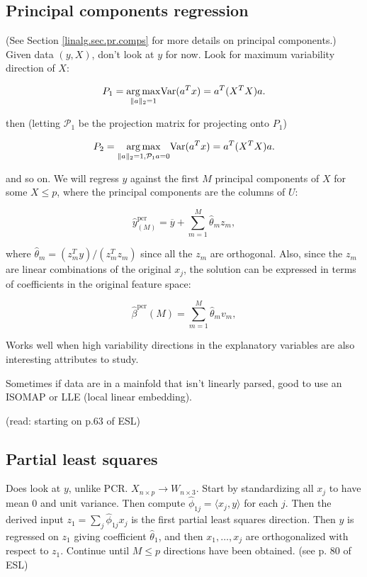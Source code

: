 \subsection{Principal components regression}

(See Section \ref{linalg.sec.pr.comps} for more details on principal components.) Given data \((y, X)\), don't look at \(y\) for now. Look for maximum variability direction of \(X\):

\[
P_1 = \underset{ \lVert a \rVert_2 = 1}{\arg \max}  \mathrm{Var}(a^Tx) = a^T(X^TX)a.
\]

then (letting \(\mathcal{P}_1\) be the projection matrix for projecting onto \(P_1\))

\[
P_2 = \underset{ \lVert a \rVert_2 = 1, \mathcal{P}_1a = 0}{\arg \max}  \mathrm{Var}(a^Tx) = a^T(X^TX)a.
\]

and so on. We will regress \(y\) against the first \(M\) principal components of \(X\) for some \(X \leq p\), where the principal components are the columns of \(U\):

\[
\hat{y}_{(M)}^{\text{pcr}} = \overline{y} + \sum_{m=1}^M\hat{\theta}_m z_m, 
\]

where \(\hat{\theta}_m = (z_m^Ty)/(z_m^Tz_m)\) since all the \(z_m\) are orthogonal. Also, since the \(z_m\) are linear combinations of the original \(x_j\), the solution can be expressed in terms of coefficients in the original feature space:

\[
\hat{\beta}^{\text{pcr}}(M)  =  \sum_{m=1}^M\hat{\theta}_m v_m, 
\]

Works well when high variability directions in the explanatory variables are also interesting attributes to study. 

Sometimes if data are in a mainfold that isn't linearly parsed, good to use an ISOMAP or LLE (local linear embedding).

(read: starting on p.63 of ESL)

\subsection{Partial least squares}

Does look at \(y\), unlike PCR. \(X_{n \times p} \to W_{n \times 3}\). Start by standardizing all \(x_j\) to have mean 0 and unit variance. Then compute \(\hat{\phi}_{1j} = \langle x_j, y \rangle\) for each \(j\). Then the derived input \(z_1 = \sum_j \hat{\phi}_{1j} x_j\) is the first partial least squares direction. Then \(y\) is regressed on \(z_1\) giving coefficient \(\hat{\theta}_1\), and then \(x_1, \ldots, x_j\) are orthogonalized with respect to \(z_1\). Continue until \(M \leq p\) directions have been obtained. (see p. 80 of ESL)


